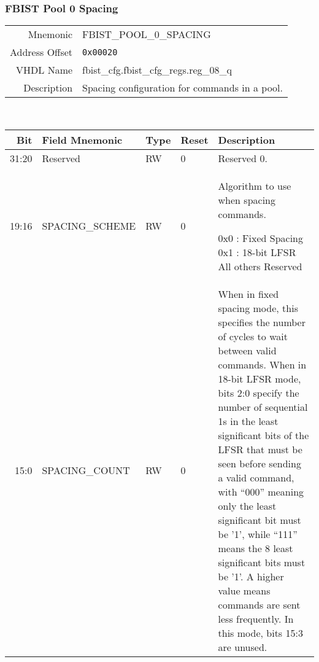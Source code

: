 \subsubsection{FBIST Pool 0 Spacing}
\begin{tabular}{ r | p{350px} }
  Mnemonic       & FBIST\_POOL\_0\_SPACING                 \\
  Address Offset & \texttt{0x00020}                        \\
  VHDL Name      &  fbist\_cfg.fbist\_cfg\_regs.reg\_08\_q \\ \hline

  Description &
  Spacing configuration for commands in a pool. \\
\end{tabular}
\\
\begin{tabularx}{\textwidth}{r|l|l|l|X}
  \hline
  Bit   & Field Mnemonic  & Type & Reset & Description \\ \hline

  31:20 & Reserved        & RW   & 0     &

  Reserved 0. \\

  19:16 & SPACING\_SCHEME & RW   & 0     &

  Algorithm to use when spacing commands.

  \setlength\parindent{24pt}
  \indent 0x0 : Fixed Spacing \newline
  \indent 0x1 : 18-bit LFSR   \newline
  \indent All others Reserved \\

  15:0  & SPACING\_COUNT  & RW   & 0     &

  When in fixed spacing mode, this specifies the number of cycles to
  wait between valid commands. When in 18-bit LFSR mode, bits 2:0
  specify the number of sequential 1s in the least significant bits of
  the LFSR that must be seen before sending a valid command, with
  ``000'' meaning only the least significant bit must be '1', while
  ``111'' means the 8 least significant bits must be '1'. A higher
  value means commands are sent less frequently. In this mode, bits
  15:3 are unused.\\
\end{tabularx}

